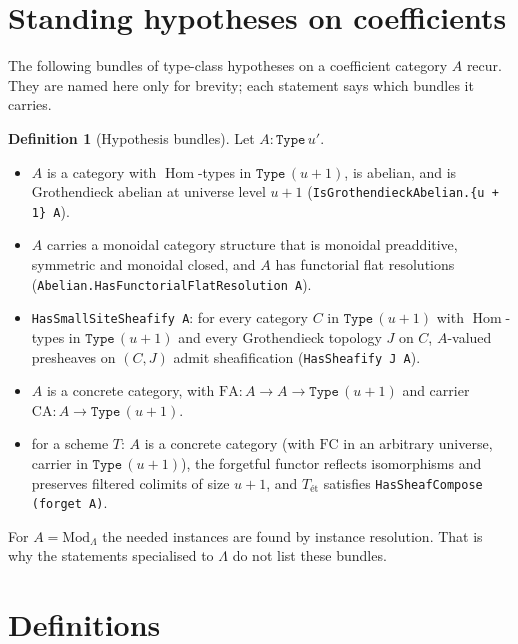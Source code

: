 \documentclass[10pt]{article}
\theoremstyle{definition}
\newtheorem{definition}{Definition}[section]
\theoremstyle{remark}
\newcommand{\lean}[1]{{\small\nolinkurl{#1}}}
\newcommand{\leanu}[1]{{\small\texttt{#1}}}
\newcommand{\et}{\text{\'et}}
\newcommand{\Mod}{\mathrm{Mod}}
\newcommand{\Hom}{\operatorname{Hom}}
\begin{document}
\tableofcontents

\section{Standing hypotheses on coefficients}

The following bundles of type-class hypotheses on a coefficient category $A$ recur. They
are named here only for brevity; each statement says which bundles it carries.

\begin{definition}[Hypothesis bundles]\label{def:bundles}
Let $A:\mathtt{Type}\,u'$.
\begin{itemize}
\item[\textbf{(Ab)}] $A$ is a category with $\Hom$-types in $\mathtt{Type}\,(u+1)$, is
abelian, and is Grothendieck abelian at universe level $u+1$
(\lean{IsGrothendieckAbelian.{u + 1} A}).
\item[\textbf{(Mon)}] $A$ carries a monoidal category structure that is monoidal
preadditive, symmetric and monoidal closed, and $A$ has functorial flat resolutions
(\leanu{Abelian.HasFunctorialFlatResolution A}).
\item[\textbf{(Shf)}] \leanu{HasSmallSiteSheafify A}: for every category $C$ in
$\mathtt{Type}\,(u+1)$ with $\Hom$-types in $\mathtt{Type}\,(u+1)$ and every Grothendieck
topology $J$ on $C$, $A$-valued presheaves on $(C,J)$ admit sheafification
(\leanu{HasSheafify J A}).
\item[\textbf{(Conc)}] $A$ is a concrete category, with
$\mathrm{FA}:A\to A\to\mathtt{Type}\,(u+1)$ and carrier $\mathrm{CA}:A\to\mathtt{Type}\,(u+1)$.
\item[\textbf{(Conc$^+_T$)}] for a scheme $T$: $A$ is a concrete category (with
$\mathrm{FC}$ in an arbitrary universe, carrier in $\mathtt{Type}\,(u+1)$), the forgetful
functor reflects isomorphisms and preserves filtered colimits of size $u+1$, and
$T_{\et}$ satisfies \leanu{HasSheafCompose (forget A)}.
\end{itemize}
For $A=\Mod_\Lambda$ the needed instances are found by instance resolution. That is
why the statements specialised to $\Lambda$ do not list these bundles.
\end{definition}

\section{Definitions}
\end{document}
